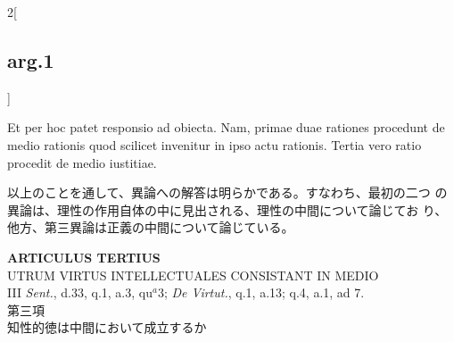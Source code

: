 \documentclass[paper=a4paper,fontsize=10pt,jafontsize=9pt,titlepage]{jlreq}
\begin{document}
\begin{paracol}{2}[\subsection{arg.1}]
\switchcolumn*

Et per hoc patet responsio ad obiecta. Nam, primae duae rationes
procedunt de medio rationis quod scilicet invenitur in ipso actu
rationis. Tertia vero ratio procedit de medio iustitiae.

\switchcolumn

以上のことを通して、異論への解答は明らかである。すなわち、最初の二つ
 の異論は、理性の作用自体の中に見出される、理性の中間について論じてお
 り、他方、第三異論は正義の中間について論じている。

\end{paracol}
\newpage
{}
{}
\setcounter{section}{3}
\setcounter{subsection}{0}






\begin{center}
{\Large {\bfseries ARTICULUS TERTIUS}}\\
{\large UTRUM VIRTUS INTELLECTUALES CONSISTANT IN MEDIO}\\
{\footnotesize III {\itshape Sent.}, d.33, q.1, a.3, qu$^{a}$3; {\itshape De Virtut.}, q.1, a.13; q.4, a.1, ad 7.}\\
{\Large 第三項\\知性的徳は中間において成立するか}
\end{center}
\end{document}
